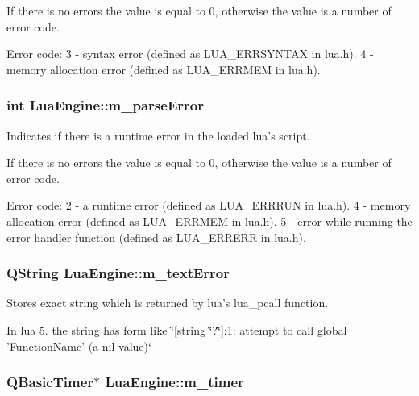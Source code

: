 If there is no errors the value is equal to 0, otherwise the value is a number of error code. \begin{DoxyVerb}            Error code:
            3 - syntax error (defined as LUA_ERRSYNTAX in lua.h).
            4 - memory allocation error (defined as LUA_ERRMEM in lua.h).\end{DoxyVerb}
 \hypertarget{class_lua_engine_ac7c65e343f73a0dadcbe2d5f1a5842f3}{
\subsubsection[{m\-\_\-parse\-Error}]{\setlength{\rightskip}{0pt plus 5cm}int Lua\-Engine\-::m\-\_\-parse\-Error\hspace{0.3cm}{\ttfamily [private]}}}\label{class_lua_engine_ac7c65e343f73a0dadcbe2d5f1a5842f3}


Indicates if there is a runtime error in the loaded lua's script. 

If there is no errors the value is equal to 0, otherwise the value is a number of error code. \begin{DoxyVerb}            Error code:
            2 - a runtime error (defined as LUA_ERRRUN in lua.h).
            4 - memory allocation error (defined as LUA_ERRMEM in lua.h).
            5 - error while running the error handler function (defined as LUA_ERRERR in lua.h).\end{DoxyVerb}
 \hypertarget{class_lua_engine_a0cb5dc043a3f9b162ad97245cd7e6956}{
\subsubsection[{m\-\_\-text\-Error}]{\setlength{\rightskip}{0pt plus 5cm}Q\-String Lua\-Engine\-::m\-\_\-text\-Error\hspace{0.3cm}{\ttfamily [private]}}}\label{class_lua_engine_a0cb5dc043a3f9b162ad97245cd7e6956}


Stores exact string which is returned by lua's lua\-\_\-pcall function. 

In lua 5. the string has form like \char`\"{}\mbox{[}string \char`\"{}?\char`\"{}\mbox{]}\-:1\-: attempt to call global '\-Function\-Name' (a nil value)\char`\"{} \hypertarget{class_lua_engine_a367284a1461c5a2d2804c3f9b4d94f14}{
\subsubsection[{m\-\_\-timer}]{\setlength{\rightskip}{0pt plus 5cm}Q\-Basic\-Timer$\ast$ Lua\-Engine\-::m\-\_\-timer\hspace{0.3cm}{\ttfamily [private]}}}\label{class_lua_engine_a367284a1461c5a2d2804c3f9b4d94f14}


